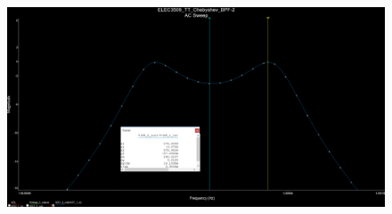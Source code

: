 \documentclass[hidelinks]{article}
\begin{document}
	\begin{figure}[htbp]
		\centering
		\includegraphics[width=0.6\textheight]{simulated_ripple1.png}
		\label{f:simulated_ripple1}
	\end{figure}
	
	
	
	
	
	
	
	
	
	
	
	
\end{document}
